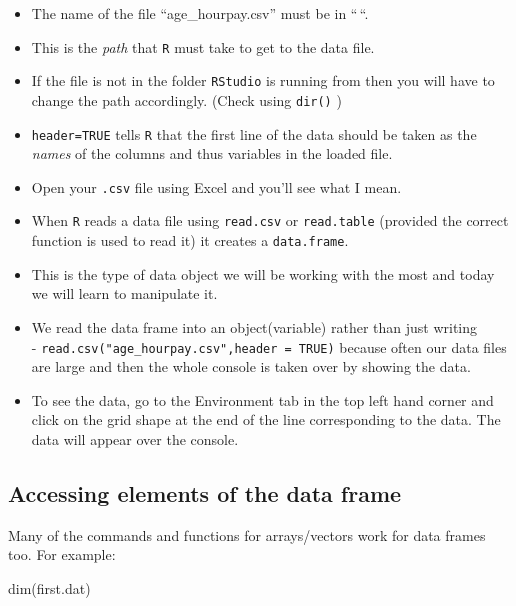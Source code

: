 \documentclass[
]{gitbook}
\newenvironment{Shaded}{\begin{snugshade}}{\end{snugshade}}
\newcommand{\FunctionTok}[1]{\textcolor[rgb]{0.00,0.00,0.00}{#1}}
\newcommand{\NormalTok}[1]{#1}
\providecommand{\tightlist}{%
  \setlength{\itemsep}{0pt}\setlength{\parskip}{0pt}}
\begin{document}
\begin{itemize}
\tightlist
\item
  The name of the file ``age\_hourpay.csv'' must be in ``\,``.
\item
  This is the \emph{path} that \texttt{R} must take to get to the data file.
\item
  If the file is not in the folder \texttt{RStudio} is running from then you will have to change the path accordingly. (Check using \texttt{dir()} )
\item
  \texttt{header=TRUE} tells \texttt{R} that the first line of the data should be taken as the \emph{names} of the columns and thus variables in the loaded file.
\item
  Open your \texttt{.csv} file using Excel and you'll see what I mean.
\item
  When \texttt{R} reads a data file using \texttt{read.csv} or \texttt{read.table} (provided the correct function is used to read it) it creates a \texttt{data.frame}.
\item
  This is the type of data object we will be working with the most and today we will learn to manipulate it.
\item
  We read the data frame into an object(variable) rather than just writing\\
  - \texttt{read.csv("age\_hourpay.csv",header\ =\ TRUE)} because often our data files are large and then the whole console is taken over by showing the data.
\item
  To see the data, go to the Environment tab in the top left hand corner and click on the grid shape at the end of the line corresponding to the data. The data will appear over the console.
\end{itemize}

\hypertarget{accessing-elements-of-the-data-frame}{%
\subsection{Accessing elements of the data frame}\label{accessing-elements-of-the-data-frame}}

Many of the commands and functions for arrays/vectors work for data frames too. For example:

\begin{Shaded}
\begin{Highlighting}[]
\FunctionTok{dim}\NormalTok{(first.dat)}
\end{Highlighting}
\end{Shaded}
\end{document}
